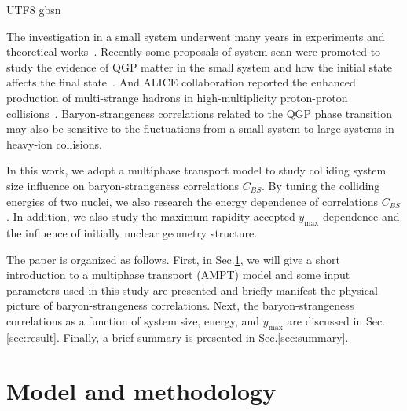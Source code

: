 \documentclass[twocolumn,showpacs,preprintnumbers,superscriptaddress,amsmath,amssymb]{revtex4}
\begin{document}
\begin{CJK*} {UTF8} {gbsn}
	\par
	The investigation in a small system underwent many years in experiments and theoretical works~\cite{small_sys_LHC,small_sys_1}. Recently some proposals of system scan were promoted to study the evidence of QGP matter in the small system and how the initial state affects the final state~\cite{SHuang2020sysScan,PRC2029sysScanLHC,ZHANG2020135366}.
	And ALICE collaboration reported the enhanced production of multi-strange hadrons in high-multiplicity proton-proton collisions~\cite{smallSystemALICE2017}. Baryon-strangeness correlations related to the QGP phase transition may also be sensitive to the fluctuations from a small system to large systems in heavy-ion collisions.
	
	
	
	
	\par
	In this work, we adopt a multiphase transport model to study colliding system size influence on baryon-strangeness correlations $C_{BS}$.
	By tuning the colliding energies of two nuclei, we also research the energy dependence of correlations $C_{BS}$.
		In addition, we also study the maximum rapidity accepted $y_{\text{max}}$ dependence and the influence of initially nuclear geometry structure.
	
	The paper is organized as follows. 
	First, in Sec.\ref{sec:model}, we will give a short introduction to a multiphase transport (AMPT) model and some input parameters used in this study are presented
	and briefly manifest the physical picture of baryon-strangeness correlations.
	Next, the baryon-strangeness correlations as a function of system size, energy, and $y_{\text{max}}$ are discussed in Sec.\ref{sec:result}. 
	Finally, a brief summary is presented in Sec.\ref{sec:summary}.
	
	
	\section{Model and methodology}
	\label{sec:model}

\end{CJK*}
\end{document}
